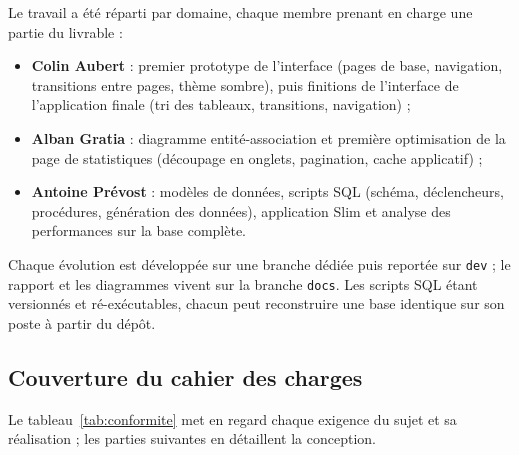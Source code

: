 Le travail a été réparti par domaine, chaque membre prenant en charge une partie du livrable :
\begin{itemize}
	\item \textbf{Colin Aubert} : premier prototype de l'interface (pages de base, navigation, transitions entre pages, thème sombre), puis finitions de l'interface de l'application finale (tri des tableaux, transitions, navigation) ;
	\item \textbf{Alban Gratia} : diagramme entité-association et première optimisation de la page de statistiques (découpage en onglets, pagination, cache applicatif) ;
	\item \textbf{Antoine Prévost} : modèles de données, scripts SQL (schéma, déclencheurs, procédures, génération des données), application Slim et analyse des performances sur la base complète.
\end{itemize}

Chaque évolution est développée sur une branche dédiée puis reportée sur \texttt{dev} ; le rapport et les diagrammes vivent sur la branche \texttt{docs}. Les scripts SQL étant versionnés et ré-exécutables, chacun peut reconstruire une base identique sur son poste à partir du dépôt.

\subsection{Couverture du cahier des charges}

Le tableau~\ref{tab:conformite} met en regard chaque exigence du sujet et sa réalisation ; les parties suivantes en détaillent la conception.

